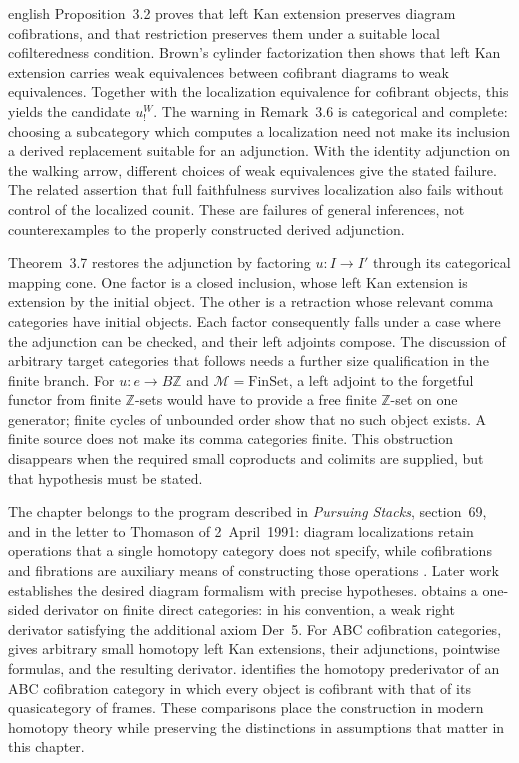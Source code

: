 \begin{otherlanguage*}{english}
Proposition~3.2 proves that left Kan extension preserves diagram cofibrations, and that restriction preserves them under a suitable local cofilteredness condition. Brown's cylinder factorization then shows that left Kan extension carries weak equivalences between cofibrant diagrams to weak equivalences. Together with the localization equivalence for cofibrant objects, this yields the candidate $u_!^W$. The warning in Remark~3.6 is categorical and complete: choosing a subcategory which computes a localization need not make its inclusion a derived replacement suitable for an adjunction. With the identity adjunction on the walking arrow, different choices of weak equivalences give the stated failure. The related assertion that full faithfulness survives localization also fails without control of the localized counit. These are failures of general inferences, not counterexamples to the properly constructed derived adjunction.

Theorem~3.7 restores the adjunction by factoring $u:I\to I'$ through its categorical mapping cone. One factor is a closed inclusion, whose left Kan extension is extension by the initial object. The other is a retraction whose relevant comma categories have initial objects. Each factor consequently falls under a case where the adjunction can be checked, and their left adjoints compose. The discussion of arbitrary target categories that follows needs a further size qualification in the finite branch. For $u:e\to B\mathbb Z$ and $\mathcal M=\mathrm{FinSet}$, a left adjoint to the forgetful functor from finite $\mathbb Z$-sets would have to provide a free finite $\mathbb Z$-set on one generator; finite cycles of unbounded order show that no such object exists. A finite source does not make its comma categories finite. This obstruction disappears when the required small coproducts and colimits are supplied, but that hypothesis must be stated.

The chapter belongs to the program described in \emph{Pursuing Stacks}, section~69, and in the letter to Thomason of 2~April~1991: diagram localizations retain operations that a single homotopy category does not specify, while cofibrations and fibrations are auxiliary means of constructing those operations \citep{Grothendieck1983,Grothendieck1991Letter}. Later work establishes the desired diagram formalism with precise hypotheses. \citet[Corollary~2.24]{Cisinski2010} obtains a one-sided derivator on finite direct categories: in his convention, a weak right derivator satisfying the additional axiom Der~5. For ABC cofibration categories, \citet[Theorems~9.6.3, 9.6.5, and 10.3.2]{RadulescuBanu2009} gives arbitrary small homotopy left Kan extensions, their adjunctions, pointwise formulas, and the resulting derivator. \citet[Theorem~3.33]{Lenz2018} identifies the homotopy prederivator of an ABC cofibration category in which every object is cofibrant with that of its quasicategory of frames. These comparisons place the construction in modern homotopy theory while preserving the distinctions in assumptions that matter in this chapter.


\end{otherlanguage*}
